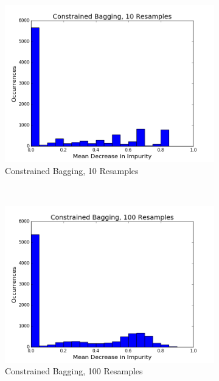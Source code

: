 \begin{figure}[h!]
\begin{subfigure}[b]{0.45\textwidth}
    \includegraphics[width=\textwidth]{figures/random_forests/bagging_bias_constrained_bagging_hist_10.png}
    \caption{Constrained Bagging, 10 Resamples}
    \label{fig:bagging-bias-constrained-10}
  \end{subfigure}
  ~
  \begin{subfigure}[b]{0.45\textwidth}
    \includegraphics[width=\textwidth]{figures/random_forests/bagging_bias_constrained_bagging_hist_100.png}
    \caption{Constrained Bagging, 100 Resamples}
    \label{fig:bagging-bias-constrained-100}
  \end{subfigure}
  ~
  \begin{subfigure}[b]{0.45\textwidth}

\end{subfigure}
\end{figure}
